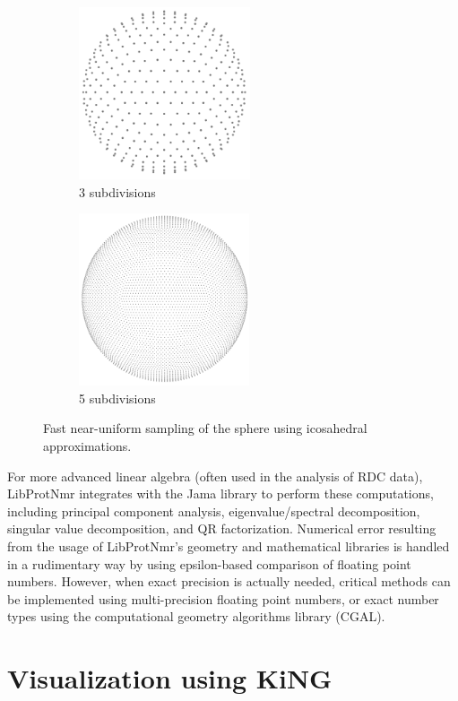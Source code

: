 \documentclass[11pt]{article}
\newcommand{\software}[1]{{\sc #1}}
\newcommand{\libprotnmr}{\software{LibProtNmr}}
\begin{document}
\begin{figure}
	\centering
	\begin{subfigure}{0.49\textwidth}
		\centering
		\includegraphics[height=2in]{figures/geodesicGrid3}
		\caption{3 subdivisions}
	\end{subfigure}
	\begin{subfigure}{0.49\textwidth}
		\centering
		\includegraphics[height=2in]{figures/geodesicGrid5}
		\caption{5 subdivisions}
	\end{subfigure}
	\caption{
		Fast near-uniform sampling of the sphere using icosahedral approximations.
	}
	\label{fig:geodesicGrid}
\end{figure}

For more advanced linear algebra (often used in the analysis of RDC data), {\libprotnmr} integrates with the Jama library to perform these computations, including principal component analysis, eigenvalue/spectral decomposition, singular value decomposition, and QR factorization. Numerical error resulting from the usage of {\libprotnmr}'s geometry and mathematical libraries is handled in a rudimentary way by using epsilon-based comparison of floating point numbers. However, when exact precision is actually needed, critical methods can be implemented using multi-precision floating point numbers, or exact number types using the computational geometry algorithms library (CGAL).


\section{Visualization using KiNG}
\end{document}
